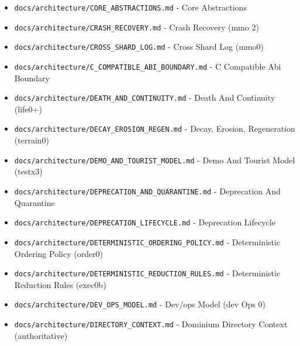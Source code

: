 \documentclass[10.5pt,a4paper,openany]{book}
\begin{document}
\begin{itemize}
\item \texttt{docs/\allowbreak{}architecture/\allowbreak{}CORE\_\allowbreak{}ABSTRACTIONS.\allowbreak{}md} -\allowbreak{} Core Abstractions
\item \texttt{docs/\allowbreak{}architecture/\allowbreak{}CRASH\_\allowbreak{}RECOVERY.\allowbreak{}md} -\allowbreak{} Crash Recovery (mmo 2)
\item \texttt{docs/\allowbreak{}architecture/\allowbreak{}CROSS\_\allowbreak{}SHARD\_\allowbreak{}LOG.\allowbreak{}md} -\allowbreak{} Cross Shard Log (mmo0)
\item \texttt{docs/\allowbreak{}architecture/\allowbreak{}C\_\allowbreak{}COMPATIBLE\_\allowbreak{}ABI\_\allowbreak{}BOUNDARY.\allowbreak{}md} -\allowbreak{} C Compatible Abi Boundary
\item \texttt{docs/\allowbreak{}architecture/\allowbreak{}DEATH\_\allowbreak{}AND\_\allowbreak{}CONTINUITY.\allowbreak{}md} -\allowbreak{} Death And Continuity (life0+)
\item \texttt{docs/\allowbreak{}architecture/\allowbreak{}DECAY\_\allowbreak{}EROSION\_\allowbreak{}REGEN.\allowbreak{}md} -\allowbreak{} Decay, Erosion, Regeneration (terrain0)
\item \texttt{docs/\allowbreak{}architecture/\allowbreak{}DEMO\_\allowbreak{}AND\_\allowbreak{}TOURIST\_\allowbreak{}MODEL.\allowbreak{}md} -\allowbreak{} Demo And Tourist Model (testx3)
\item \texttt{docs/\allowbreak{}architecture/\allowbreak{}DEPRECATION\_\allowbreak{}AND\_\allowbreak{}QUARANTINE.\allowbreak{}md} -\allowbreak{} Deprecation And Quarantine
\item \texttt{docs/\allowbreak{}architecture/\allowbreak{}DEPRECATION\_\allowbreak{}LIFECYCLE.\allowbreak{}md} -\allowbreak{} Deprecation Lifecycle
\item \texttt{docs/\allowbreak{}architecture/\allowbreak{}DETERMINISTIC\_\allowbreak{}ORDERING\_\allowbreak{}POLICY.\allowbreak{}md} -\allowbreak{} Deterministic Ordering Policy (order0)
\item \texttt{docs/\allowbreak{}architecture/\allowbreak{}DETERMINISTIC\_\allowbreak{}REDUCTION\_\allowbreak{}RULES.\allowbreak{}md} -\allowbreak{} Deterministic Reduction Rules (exec0b)
\item \texttt{docs/\allowbreak{}architecture/\allowbreak{}DEV\_\allowbreak{}OPS\_\allowbreak{}MODEL.\allowbreak{}md} -\allowbreak{} Dev/\allowbreak{}ops Model (dev Ops 0)
\item \texttt{docs/\allowbreak{}architecture/\allowbreak{}DIRECTORY\_\allowbreak{}CONTEXT.\allowbreak{}md} -\allowbreak{} Dominium Directory Context (authoritative)

\end{itemize}
\end{document}
